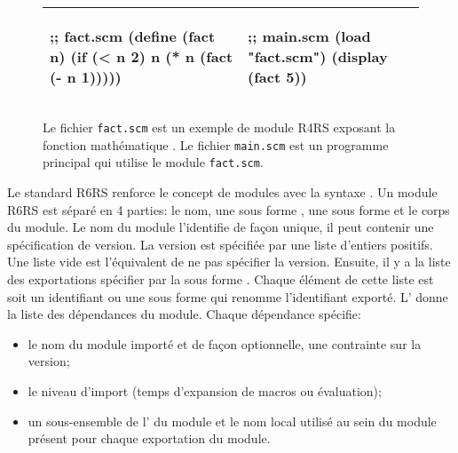 \begin{figure}[ht]
  \begin{center}
    \begin{tabular}{|l|l|}
    \hline
    \begin{mplisting}{0.4}
;; fact.scm
(define (fact n)
  (if (< n 2)
    n
    (* n (fact (- n 1)))))
\end{mplisting} &
    \begin{mplisting}{0.4}
;; main.scm
(load "fact.scm")
(display (fact 5))
\end{mplisting} \\\hline
    \end{tabular}
  \end{center}

  \caption{Le fichier \texttt{fact.scm} est un exemple de module R4RS exposant
  la fonction mathématique . Le fichier \texttt{main.scm} est un
  programme principal qui utilise le module \texttt{fact.scm}.}
  \label{fig:r4rs_fact}
\end{figure}



Le standard R6RS\cite{Scheme:R6RS} renforce le concept de modules avec la
syntaxe .  Un module R6RS est séparé en 4 parties: le nom, une
sous forme , une sous forme  et le corps du
module. Le nom du module l'identifie de façon unique, il peut contenir une
spécification de version. La version est spécifiée par une liste d'entiers
positifs. Une liste vide \lstcode{()} est l'équivalent de ne pas spécifier la
version. Ensuite, il y a la liste des exportations spécifier par la sous forme
. Chaque élément de cette liste est soit un identifiant ou une
sous forme  qui renomme l'identifiant exporté.
L' donne la liste des dépendances du module. Chaque dépendance
spécifie:

\begin{itemize}
  \item le nom du module importé et de façon optionnelle, une contrainte sur
    la version;
  \item le niveau d'import (temps d'expansion de macros ou évaluation);
  \item un sous-ensemble de l' du module et le nom local
    utilisé au sein du module présent pour chaque exportation du module.
\end{itemize}

